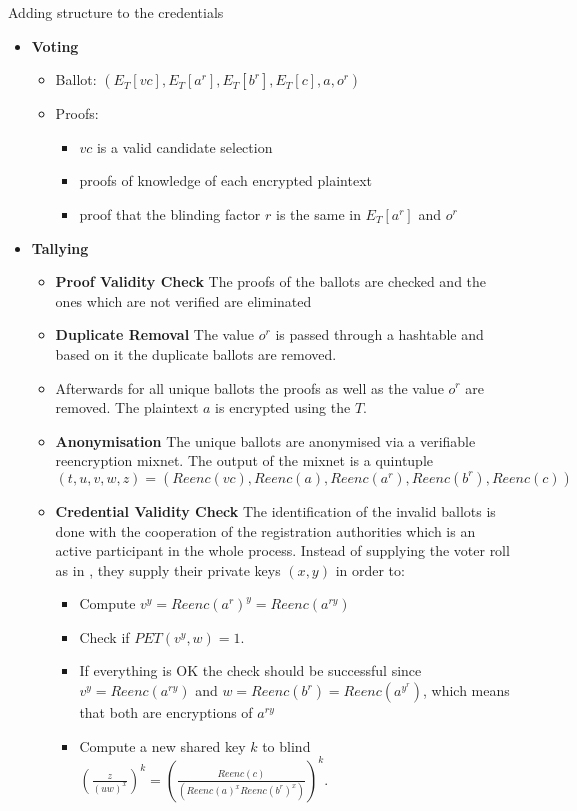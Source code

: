 \documentclass{beamer}
\begin{document}
\begin{frame}[allowframebreaks]{Adding structure to the credentials \cite{AraujoFT07}}
\begin{itemize}
\item \textbf{Voting} 
	\begin{itemize}
		\item Ballot: $(E_T[vc],E_T[a^r],E_T[b^r],E_T[c], a, o^r)$
		\item Proofs: 
		\begin{itemize}
			\item $vc$ is a valid candidate selection
			\item proofs of knowledge of each encrypted plaintext
			\item proof that the blinding factor $r$ is the same in $E_T[a^r]$ and $o^r$
		\end{itemize} 
	\end{itemize} 

\framebreak

\item \textbf{Tallying}  
	\begin{itemize}
		\item \textbf{Proof Validity Check} The proofs of the ballots are checked and the ones which are not verified are eliminated
		\item \textbf{Duplicate Removal} The value $o^r$ is passed through a hashtable and based on it the duplicate ballots are removed. 
		\item Afterwards for all unique ballots the proofs as well as the value $o^r$ are removed. The plaintext $a$ is encrypted using the $T$. 
		\item \textbf{Anonymisation} The unique ballots are anonymised via a verifiable reencryption mixnet. The output of the mixnet is a quintuple 
		$(t,u,v,w,z)=(Reenc(vc),Reenc(a),Reenc(a^r),Reenc(b^r),Reenc(c))$ 
		\item \textbf{Credential Validity Check} The identification of the invalid ballots is done with the cooperation of the registration authorities which is an active participant in the whole process. Instead of supplying the voter roll as in \cite{juels2005coercion}, they supply their private keys $(x,y)$ in order to:
		\begin{itemize}
		\item Compute $v^y = Reenc(a^r)^{y}=Reenc(a^{ry})$
		\item Check if $PET(v^y,w) = 1$. 
		\item If everything is OK the check should be successful since $v^y = Reenc(a^{ry})$ and $w = Reenc(b^r) = Reenc(a^{y^r})$, which means that both are encryptions of $a^{ry}$
		\item Compute a new shared key $k$  to blind  $(\frac{z}{(uw)^x})^k = (\frac{Reenc(c)}{(Reenc(a)^x Reenc(b^r)^x)})^k$. 

\end{itemize}
\end{itemize}
\end{itemize}
\end{frame}
\end{document}
